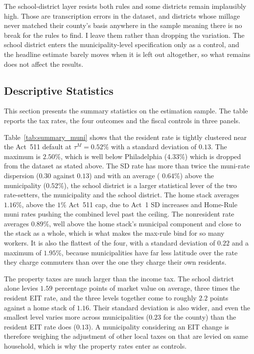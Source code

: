 \documentclass[12pt]{article}
\begin{document}
The school-district layer resists both rules and some districts remain
implausibly high. Those are transcription errors in the dataset, and districts whose
millage never matched their county's basis anywhere in the sample meaning
there is no break for the rules to find. I leave them rather than
dropping the variation. The school district enters the
municipality-level specification only as a control, and the headline
estimate barely moves when it is left out altogether, so what remains
does not affect the results.

\subsection{Descriptive Statistics}
\label{subsec:descriptive}

This section presents the summary statistics on the estimation sample. The table reports the tax rates, the four
outcomes and the fiscal controls in three panels.

% 



Table~\ref{tab:summary_muni} shows that the resident rate is tightly clustered near the Act~511 default at
$\tau^{M}=0.52\%$ with a standard deviation of $0.13$. The
maximum is $2.50\%$, which is well below Philadelphia ($4.33\%$) which is dropped from the dataset as stated above. The SD rate has
more than twice the muni-rate dispersion ($0.30$ against $0.13$) and with an average ( $0.64\%$) above the municipality ($0.52\%$), the school district is a larger statistical
lever of the two rate-setters, the municipality and the school district. The home stack averages $1.16\%$, above
the $1\%$ Act~511 cap, due to Act~1 SD increases and Home-Rule muni
rates pushing the combined level past the ceiling. The nonresident rate
averages $0.89\%$, well above the home stack's municipal component and
close to the stack as a whole, which is what makes the max-rule bind for
so many workers. It is also the flattest of the four, with a standard
deviation of $0.22$ and a maximum of $1.95\%$, because municipalities
have far less latitude over the rate they charge commuters than over the
one they charge their own residents.

The property taxes are much larger than the income tax. The school district alone
levies $1.59$ percentage points of market value on average, three times
the resident EIT rate, and the three levels together come to roughly
$2.2$ points against a home stack of $1.16$. Their standard deviation is also
wider, and even the smallest level varies more across municipalities
($0.23$ for the county) than the resident EIT rate does ($0.13$). A municipality
considering an EIT change is therefore weighing the adjustment of other
local taxes on that are levied on same household, which is why the property rates
enter as controls.
\end{document}
